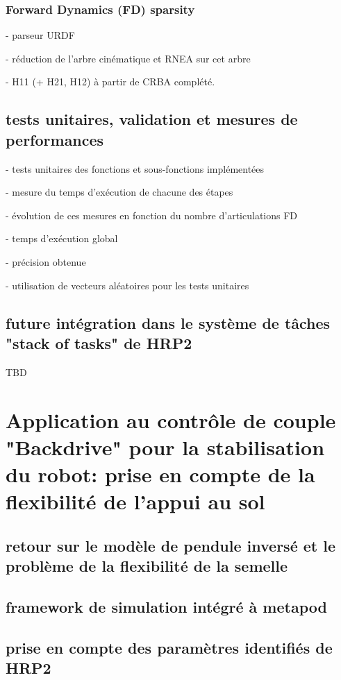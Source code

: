 \documentclass{report}
\begin{document}
\subsection{Forward Dynamics (FD) sparsity}
- parseur URDF

- réduction de l'arbre cinématique et RNEA sur cet arbre

- H11 (+ H21, H12) à partir de CRBA complété.



\section{tests unitaires, validation et mesures de performances}

- tests unitaires des fonctions et sous-fonctions implémentées

- mesure du temps d'exécution de chacune des étapes

- évolution de ces mesures en fonction du nombre d'articulations FD

- temps d'exécution global

- précision obtenue

- utilisation de vecteurs aléatoires pour les tests unitaires

\section{future intégration dans le système de tâches "stack of tasks" de HRP2}

TBD

\chapter{Application au contrôle de couple "Backdrive" pour la stabilisation du robot: prise en compte de la flexibilité de l'appui au sol}

\section{retour sur le modèle de pendule inversé et le problème de la flexibilité de la semelle}

\section{framework de simulation intégré à metapod}

\section{prise en compte des paramètres identifiés de HRP2}
\end{document}

